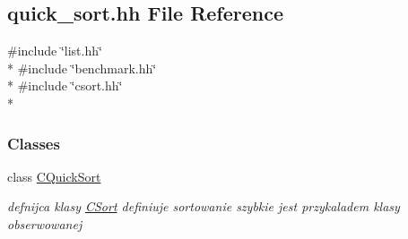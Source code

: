 \hypertarget{quick__sort_8hh}{}\subsection{quick\+\_\+sort.\+hh File Reference}
\label{quick__sort_8hh}
{\ttfamily \#include \char`\"{}list.\+hh\char`\"{}}\\*
{\ttfamily \#include \char`\"{}benchmark.\+hh\char`\"{}}\\*
{\ttfamily \#include \char`\"{}csort.\+hh\char`\"{}}\\*
\subsubsection*{Classes}
\begin{DoxyCompactItemize}
\item 
class \hyperlink{class_c_quick_sort}{C\+Quick\+Sort}
\begin{DoxyCompactList}\small\item\em defnijca klasy \hyperlink{class_c_sort}{C\+Sort} definiuje sortowanie szybkie jest przykaladem klasy obserwowanej \end{DoxyCompactList}\end{DoxyCompactItemize}
